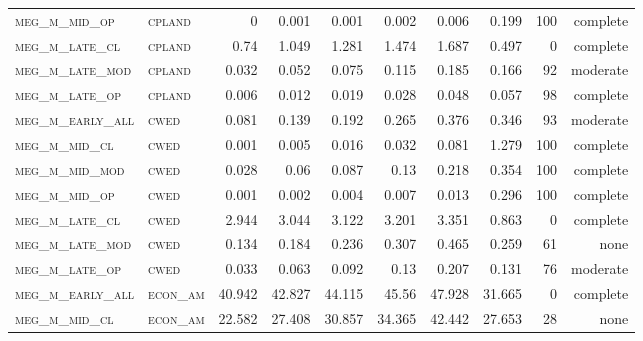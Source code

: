 \begin{landscape}
\begin{center}
\begin{footnotesize}
\begin{longtable}{llrrrrr|rrr}
\textsc{meg\_m\_mid\_op   } & \textsc{cpland    }    & 0        & 0.001    & 0.001    & 0.002    & 0.006      & 0.199         & 100           & complete             \\
\textsc{meg\_m\_late\_cl  } & \textsc{cpland    }    & 0.74     & 1.049    & 1.281    & 1.474    & 1.687      & 0.497         & 0             & complete            \\
\textsc{meg\_m\_late\_mod } & \textsc{cpland    }    & 0.032    & 0.052    & 0.075    & 0.115    & 0.185      & 0.166         & 92            & moderate              \\
\textsc{meg\_m\_late\_op  } & \textsc{cpland    }    & 0.006    & 0.012    & 0.019    & 0.028    & 0.048      & 0.057         & 98            & complete              \\
\textsc{meg\_m\_early\_all} & \textsc{cwed      }    & 0.081    & 0.139    & 0.192    & 0.265    & 0.376      & 0.346         & 93            & moderate              \\
\textsc{meg\_m\_mid\_cl   } & \textsc{cwed      }    & 0.001    & 0.005    & 0.016    & 0.032    & 0.081      & 1.279         & 100           & complete             \\
\textsc{meg\_m\_mid\_mod  } & \textsc{cwed      }    & 0.028    & 0.06     & 0.087    & 0.13     & 0.218      & 0.354         & 100           & complete             \\
\textsc{meg\_m\_mid\_op   } & \textsc{cwed      }    & 0.001    & 0.002    & 0.004    & 0.007    & 0.013      & 0.296         & 100           & complete             \\
\textsc{meg\_m\_late\_cl  } & \textsc{cwed      }    & 2.944    & 3.044    & 3.122    & 3.201    & 3.351      & 0.863         & 0             & complete            \\
\textsc{meg\_m\_late\_mod } & \textsc{cwed      }    & 0.134    & 0.184    & 0.236    & 0.307    & 0.465      & 0.259         & 61            & none              \\
\textsc{meg\_m\_late\_op  } & \textsc{cwed      }    & 0.033    & 0.063    & 0.092    & 0.13     & 0.207      & 0.131         & 76            & moderate              \\
\textsc{meg\_m\_early\_all} & \textsc{econ\_am  }    & 40.942   & 42.827   & 44.115   & 45.56    & 47.928     & 31.665        & 0             & complete            \\
\textsc{meg\_m\_mid\_cl   } & \textsc{econ\_am  }    & 22.582   & 27.408   & 30.857   & 34.365   & 42.442     & 27.653        & 28            & none             \\

\end{longtable}
\end{footnotesize}
\end{center}
\end{landscape}
